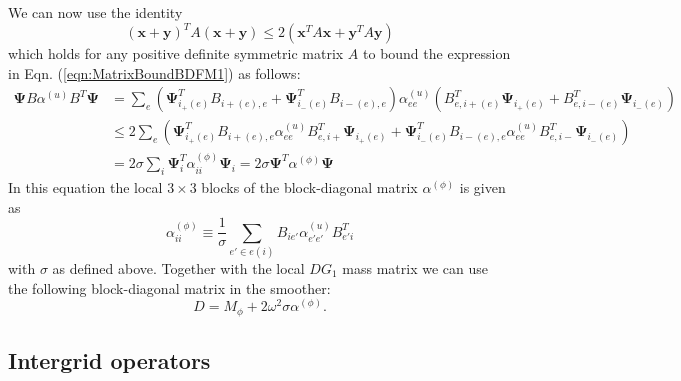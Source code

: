\documentclass[12pt]{article}
\renewcommand{\vec}[1]{\boldsymbol{#1}}
\begin{document}
We can now use the identity
\begin{equation}
\left(\vec{x}+\vec{y}\right)^T A \left(\vec{x}+\vec{y}\right)
\le 2\left(\vec{x}^T A\vec{x}+\vec{y}^T A\vec{y}\right)
\end{equation}
which holds for any positive definite symmetric matrix $A$ to bound the expression in Eqn. (\ref{eqn:MatrixBoundBDFM1}) as follows:
\begin{equation}
 \begin{aligned}
  \vec{\Psi} B \alpha^{(u)} B^T \vec{\Psi}
  &= \sum_{e} \left(\vec{\Psi}^T_{i_+(e)}B_{i+(e),e}+\vec{\Psi}^T_{i_-(e)}B_{i-(e),e}\right)\alpha^{(u)}_{ee}
\left(B^T_{e,i+(e)}\vec{\Psi}_{i_+(e)}+B^T_{e,i-(e)}\vec{\Psi}_{i_-(e)}\right)\\
  & \le 2\sum_e
\left(\vec{\Psi}^T_{i_+(e)}B_{i+(e),e}\alpha^{(u)}_{ee}B^T_{e,i+}\vec{\Psi}_{i_+(e)}
+\vec{\Psi}^T_{i_-(e)}B_{i-(e),e}\alpha^{(u)}_{ee}B^T_{e,i-}\vec{\Psi}_{i_-(e)}
\right)
\\
  &= 2 \sigma \sum_i \vec{\Psi}^T_i\alpha^{(\phi)}_{ii}\vec{\Psi}_i = 2\sigma \vec{\Psi}^T \alpha^{(\phi)}\vec{\Psi}
 \end{aligned}
\end{equation}
In this equation the local $3\times 3$ blocks of the block-diagonal matrix $\alpha^{(\phi)}$ is given as
\begin{equation}
  \alpha_{ii}^{(\phi)} \equiv \frac{1}{\sigma}\sum_{e'\in e(i)} B_{ie'}\alpha^{(u)}_{e'e'}B^T_{e'i}
\end{equation}
with $\sigma$ as defined above. 
Together with the local $DG_1$ mass matrix we can use the following block-diagonal matrix in the smoother:
\begin{equation}
  D = M_{\phi} + 2\omega^2 \sigma \alpha^{(\phi)}.
\end{equation}
\subsection{Intergrid operators}
\end{document}
